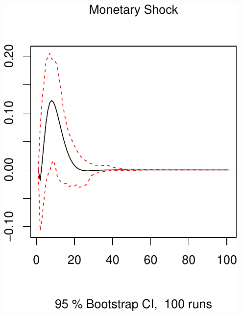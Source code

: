 \documentclass[11pt,preprint, authoryear]{elsarticle}
\numberwithin{equation}{section}
\numberwithin{figure}{section}
\numberwithin{table}{section}
\begin{document}
\includegraphics{TS_proj_files/figure-latex/unnamed-chunk-47-3.pdf}


\end{document}
